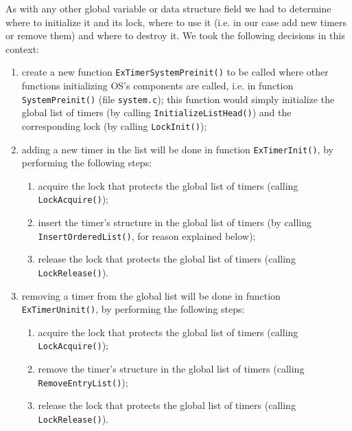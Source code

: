 As with any other global variable or data structure field we had to determine where to initialize it and its lock, where to use it (i.e. in our case add new timers or remove them) and where to destroy it. We took the following decisions in this context:
\begin{enumerate}
    \item create a new function \lstinline|ExTimerSystemPreinit()| to be called where other functions initializing OS's components are called, i.e. in function \lstinline|SystemPreinit()| (file \lstinline|system.c|); this function would simply initialize the global list of timers (by calling \lstinline|InitializeListHead()|) and the corresponding lock (by calling \lstinline|LockInit()|);
    
    \item adding a new timer in the list will be done in function \lstinline|ExTimerInit()|, by performing the following steps:
        \begin{enumerate}
            \item acquire the lock that protects the global list of timers (calling \lstinline|LockAcquire()|);
            
            \item insert the timer's structure in the global list of timers (by calling \lstinline|InsertOrderedList()|, for reason explained below);
            
            \item release the lock that protects the global list of timers (calling \lstinline|LockRelease()|).
        \end{enumerate}

    \item removing a timer from the global list will be done in function \lstinline|ExTimerUninit()|, by performing the following steps:
        \begin{enumerate}
            \item acquire the lock that protects the global list of timers (calling \lstinline|LockAcquire()|);
            
            \item remove the timer's structure in the global list of timers (calling \lstinline|RemoveEntryList()|);
            
            \item release the lock that protects the global list of timers (calling \lstinline|LockRelease()|).
        \end{enumerate}
        

\end{enumerate}
